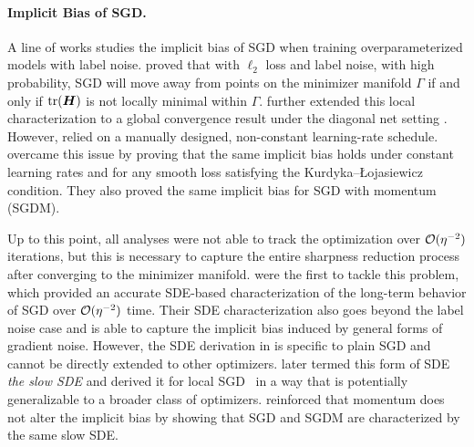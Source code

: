 \paragraph{Implicit Bias of SGD.}


A line of works studies the implicit bias of SGD when training overparameterized models with label noise.
\citet{blanc2020implicit} proved that with $\ell_2$ loss and label noise, with high probability, SGD will move away from points on the minimizer manifold $\Gamma$ if and only if $\text{tr}({\bm{H}})$ is not locally minimal within $\Gamma$. \citet{haochen2021shape} further extended this local characterization to a global convergence result under the diagonal net setting \citep{woodworth2020kernel}.
However, \citet{haochen2021shape} relied on a manually designed, non-constant learning-rate schedule. \citet{damian2021label} overcame this issue by proving that the same implicit bias holds under constant learning rates and for any smooth loss satisfying the Kurdyka–Łojasiewicz condition. They also proved the same implicit bias for SGD with momentum (SGDM).

Up to this point, all analyses were not able to track the optimization over $\mathcal{O}(\eta^{-2})$ iterations, but this is necessary to capture the entire sharpness reduction process after converging to the minimizer manifold.
\citet{li2021happens} were the first to tackle this problem, which provided an accurate SDE-based characterization of the long-term behavior of SGD over $\mathcal{O}(\eta^{-2})$ time. 
Their SDE characterization also goes beyond the label noise case and is able to capture the implicit bias induced by general forms of gradient noise.
However, the SDE derivation in \citet{li2021happens} is specific to plain SGD and cannot be directly extended to other optimizers. \citet{gu2023andwhendoeslocal} later termed this form of SDE \emph{the slow SDE} and derived it for local SGD~\citep{lin2018don} in a way that is potentially generalizable to a broader class of optimizers. 
\citet{wang2023marginal} reinforced that momentum does not alter the implicit bias by showing that SGD and SGDM are characterized by the same slow SDE.

